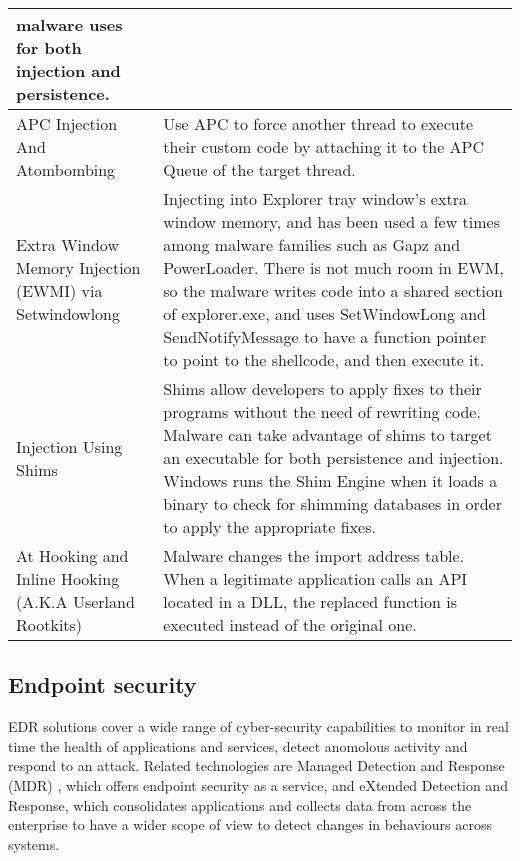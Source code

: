 \begin{table}[!ht]
\begin{tabular}{ |p{3.5cm}||p{10.5cm}|  }
               malware uses for both injection and persistence. \\
  \hline
  APC Injection And Atombombing
             & Use APC to force another thread to execute their custom code by attaching it to the APC
               Queue of the target thread. \\
  \hline
  Extra Window Memory Injection (EWMI) via Setwindowlong
             & Injecting into Explorer tray window’s extra window memory, and has been used a few times
               among malware families such as Gapz and PowerLoader. There is not much room in EWM, so the
               malware writes code into a shared section of explorer.exe, and uses SetWindowLong and
               SendNotifyMessage to have a function pointer to point to the shellcode, and then execute it. \\
  \hline
  Injection Using Shims
             & Shims allow developers to apply fixes to their programs without the need of rewriting code.
               Malware can take advantage of shims to target an executable for both persistence and injection.
               Windows runs the Shim Engine when it loads a binary to check for shimming databases in order
              to apply the appropriate fixes. \\
  \hline
  At Hooking and Inline Hooking (A.K.A Userland Rootkits)
            & Malware changes the import address table. When a legitimate application calls an API located
              in a DLL, the replaced function is executed instead of the original one. \\
  \iffalse
\fi
  \hline
\end{tabular}
\label{table: ProcessInjectionTechniques}
\end{table}


\subsection{Endpoint security}

EDR solutions cover a wide range of cyber-security capabilities to monitor in real time the health of applications
and services, detect anomolous activity and respond to an attack.
Related technologies are Managed Detection and Response (MDR) \autocite{Hayes}, which offers endpoint security as a service, and
eXtended Detection and Response, which consolidates applications and collects data from across the enterprise to
have a wider scope of view to detect changes in behaviours across systems.

